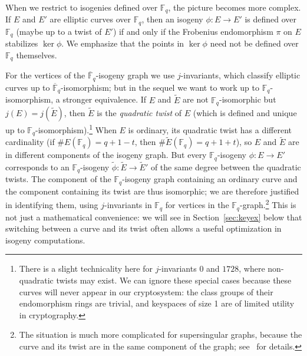 \documentclass{llncs}
\newcommand{\F}{\mathbb{F}}
\newcommand{\Fbar}{\overline{\mathbb{F}}}
\begin{document}
When we restrict to isogenies defined over $\F_q$, 
the picture becomes more complex.  
If $E$ and $E'$ are elliptic curves over $\F_q$,
then an isogeny $ϕ:E→E'$ is defined over $\F_q$
(maybe up to a twist of $E'$)
if and only if the Frobenius endomorphism $\pi$ on $E$ stabilizes $\ker ϕ$.
We emphasize that the points in $\ker\phi$ need not
be defined over $\F_q$ themselves.

For the vertices of the $\Fbar_q$-isogeny graph
we use $j$-invariants,
which classify elliptic curves up to
$\Fbar_q$-isomorphism;
but in the sequel we want to work up to $\F_q$-isomorphism,
a stronger equivalence.
If $E$ and $\tilde{E}$ are not $\F_q$-isomorphic
but $j(E) = j(\tilde{E})$,
then $\tilde{E}$ is the \emph{quadratic twist} of $E$
(which is defined and unique up to $\F_q$-isomorphism).\footnote{
    There is a slight technicality here for $j$-invariants $0$ and $1728$,
    where non-quadratic twists may exist.
    We can ignore these special cases
    because these curves will never appear in our cryptosystem:
    the class groups of their endomorphism rings are trivial,
    and keyspaces of size 1 are of limited utility in cryptography.
}
When $E$ is ordinary,
its quadratic twist has a different cardinality
(if $\#E(\F_q) = q + 1 - t$, then $\#\tilde{E}(\F_q) = q + 1 + t$),
so $E$ and $\tilde{E}$ are in different components of the isogeny graph.
But every $\F_q$-isogeny $\phi: E \to E'$ 
corresponds to an $\F_q$-isogeny $\tilde{\phi}: \tilde{E} \to \tilde{E}'$
of the same degree between the quadratic twists.
The component of the $\F_q$-isogeny graph containing an ordinary curve 
and the component containing its twist are thus isomorphic;
we are therefore justified in identifying them,
using $j$-invariants in $\F_q$ for vertices in the $\F_q$-graph.\footnote{
    The situation is much more complicated for supersingular graphs,
    because the curve and its twist are in the same component
    of the graph; see~\cite[\S2]{DelfsG16} for details.
}
This is not just a mathematical convenience:
we will see in Section~\ref{sec:keyex} below 
that switching between a curve and its twist
often allows a useful optimization in isogeny computations.
\end{document}
